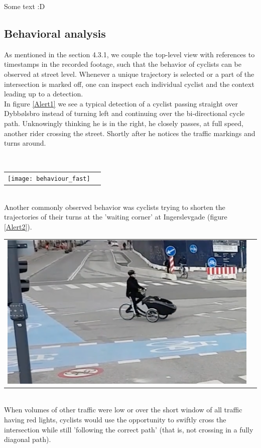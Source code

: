 Some text :D 
\ \\

\subsection{Behavioral analysis}
As mentioned in the section 4.3.1, we couple the top-level view with references to timestamps in the recorded footage, 
such that the behavior of cyclists can be observed at street level.
Whenever a unique trajectory is selected or a part of the intersection is marked off, one can inspect each individual cyclist 
and the context leading up to a detection.
\\

In figure \ref{Alert1} we see a typical detection of a cyclist passing straight over Dybbølsbro instead of turning left and 
continuing over the bi-directional cycle path. Unknowingly thinking he is in the right, he closely passes, at full speed, another rider crossing
the street. Shortly after he notices the traffic markings and turns around. 

\ \\ 
\raggedbottom
\begin{tabular}{@{}cc}
\texttt{[image: behaviour\_fast]} 
\end{tabular}
\label{Alert1}
\ \\

Another commonly observed behavior was cyclists trying to shorten the trajectories of their turns 
at the 'waiting corner' at Ingerslevgade (figure \ref{Alert2}).

\raggedbottom
\begin{tabular}{@{}cc}
\includegraphics[width=1.0\columnwidth]{shorten_traj} 
\end{tabular}
\label{Alert2}
\ \\

When volumes of other traffic were low or over the short window of all traffic having red lights, cyclists would use the opportunity 
to swiftly cross the intersection while still 'following the correct path' (that is, not crossing in a fully diagonal path). 


